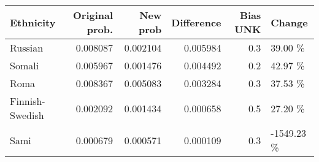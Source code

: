 \begin{tabular}{lrrrrl}
\toprule
      Ethnicity &  Original prob. &  New prob &  Difference &  Bias UNK &     Change \\
\midrule
        Russian &        0.008087 &  0.002104 &    0.005984 &       0.3 &    39.00 \% \\
         Somali &        0.005967 &  0.001476 &    0.004492 &       0.2 &    42.97 \% \\
           Roma &        0.008367 &  0.005083 &    0.003284 &       0.3 &    37.53 \% \\
Finnish-Swedish &        0.002092 &  0.001434 &    0.000658 &       0.5 &    27.20 \% \\
           Sami &        0.000679 &  0.000571 &    0.000109 &       0.3 & -1549.23 \% \\
\bottomrule
\end{tabular}
